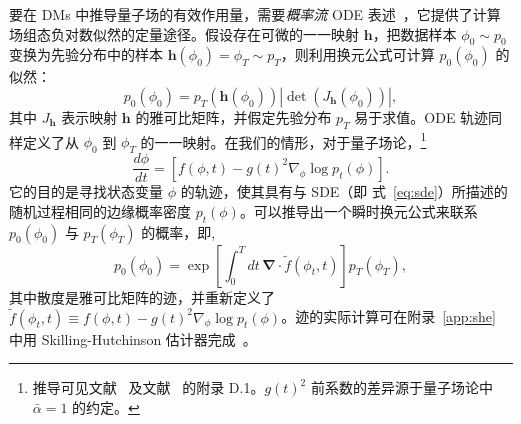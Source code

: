 {要在 DMs 中推导量子场的有效作用量，需要\textit{概率流} ODE 表述~\cite{Maoutsa:2020ode,song2021scorebased}，它提供了计算场组态负对数似然的定量途径。}假设存在可微的一一映射 $\mathbf{h}$，把数据样本 $\phi_0 \sim p_0$ 变换为先验分布中的样本 $\mathbf{h}(\phi_0) = \phi_T \sim p_T$，则利用换元公式可计算 $p_0(\phi_0)$ 的似然：
\begin{equation}
p_0(\phi_0) = p_T(\mathbf{h}(\phi_0)) |\operatorname{det}(J_\mathbf{h}(\phi_0))|,\label{eq:mapping}
\end{equation}
其中 $J_\mathbf{h}$ 表示映射 $\mathbf{h}$ 的雅可比矩阵，并假定先验分布 $p_T$ 易于求值。ODE 轨迹同样定义了从 $\phi_0$ 到 $\phi_T$ 的一一映射。在我们的情形，{对于量子场论，\footnote{推导可见文献~\cite{risken1996fokker} 及文献~\cite{song2021scorebased} 的附录 D.1。$g(t)^2$ 前系数的差异源于量子场论中 $\bar{\alpha}= 1$ 的约定。} }
\begin{equation}
\frac{d\phi}{dt} = \left[f(\phi, t) - g(t)^2 \nabla_\phi \log p_t(\phi)\right].
\label{eq:ode}
\end{equation}
它的目的是寻找状态变量 $\phi$ 的轨迹，使其具有与 SDE（即 式~\eqref{eq:sde}）所描述的随机过程相同的边缘概率密度 $p_t(\phi)$。可以推导出一个瞬时换元公式来联系 $p_0(\phi_0)$ 与 $p_T(\phi_T)$ 的概率，即,{
\begin{equation}
p_0 (\phi_0) = \exp\left[\int_0^T dt\,\mathbf{\nabla}\cdot \tilde{f}(\phi_t, t) \right] p_T(\phi_T),\label{eq:jacobian}
\end{equation}
其中散度是雅可比矩阵的迹，并重新定义了 $\tilde{f}(\phi_t, t)\equiv f(\phi, t) - g(t)^2 \nabla_\phi \log p_t(\phi)$}。迹的实际计算可在附录~\ref{app:she} 中用 Skilling-Hutchinson 估计器完成~\cite{grathwohl2018scalable}。


